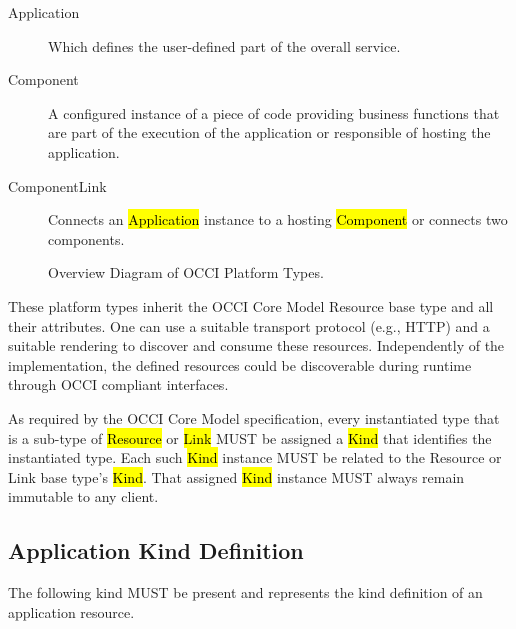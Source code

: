 \documentclass[10pt,a4paper]{article}
\begin{document}
\begin{description}
  \item[Application] Which defines the user-defined part of the overall service.
  \item[Component] A configured instance of a piece of code providing business functions that are part of the execution of the application or responsible of hosting the application.
  \item[ComponentLink] Connects an \hl{Application} instance to a hosting \hl{Component} or connects two components.
\end{description}

\begin{figure}[!h]
	{\centering {} \par}
	\caption{Overview Diagram of OCCI Platform Types.}
	\label{fig:platform_uml}
\end{figure}

These platform types inherit the OCCI Core Model Resource base type and all their attributes. One can use a suitable transport protocol (e.g., HTTP) and a suitable rendering to discover and consume these resources. Independently of the implementation, the defined resources could be discoverable during runtime through OCCI compliant interfaces.

As required by the OCCI Core Model specification, every instantiated type that is a  sub-type of \hl{Resource} or \hl{Link} MUST be assigned a \hl{Kind} that identifies the instantiated type. Each such \hl{Kind} instance MUST be related to the Resource or Link base type's \hl{Kind}. That assigned \hl{Kind} instance MUST always remain immutable to any client.

\subsection{Application Kind Definition}
The following kind MUST be present and represents the kind definition of an application resource.
\end{document}

